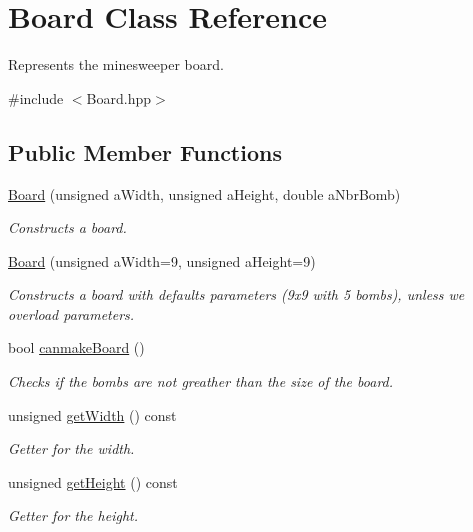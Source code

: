 \hypertarget{class_board}{}\section{Board Class Reference}
\label{class_board}


Represents the minesweeper board.  




{\ttfamily \#include $<$Board.\+hpp$>$}

\subsection*{Public Member Functions}
\begin{DoxyCompactItemize}
\item 
\hyperlink{class_board_a54307d1cc6a6ae03b097dc20040bbf4e}{Board} (unsigned a\+Width, unsigned a\+Height, double a\+Nbr\+Bomb)
\begin{DoxyCompactList}\small\item\em Constructs a board. \end{DoxyCompactList}\item 
\hyperlink{class_board_ae00af37de30a6432381047fbd368b078}{Board} (unsigned a\+Width=9, unsigned a\+Height=9)
\begin{DoxyCompactList}\small\item\em Constructs a board with defaults parameters (9x9 with 5 bombs), unless we overload parameters. \end{DoxyCompactList}\item 
bool \hyperlink{class_board_a68355307ecb32bbdc13073e029280e32}{canmake\+Board} ()
\begin{DoxyCompactList}\small\item\em Checks if the bombs are not greather than the size of the board. \end{DoxyCompactList}\item 
unsigned \hyperlink{class_board_aaee53d499b43971e1ef5b6fa0d65aca3}{get\+Width} () const
\begin{DoxyCompactList}\small\item\em Getter for the width. \end{DoxyCompactList}\item 
unsigned \hyperlink{class_board_abbc7d5be210011b7c37315512a8a2cdb}{get\+Height} () const
\begin{DoxyCompactList}\small\item\em Getter for the height. \end{DoxyCompactList}\item 

\end{DoxyCompactItemize}
